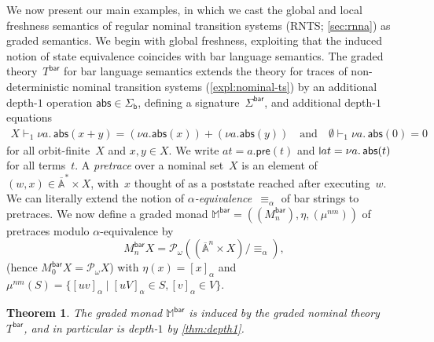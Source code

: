 \documentclass[11pt,a4paper]{amsart}
\newtheorem{theorem}{Theorem}[section]
\newcommand{\Br}{\mathsf{bar}}
\newcommand{\pre}{\mathsf{pre}}
\newcommand{\abs}{\mathsf{abs}}
\newcommand{\Term}{\mathsf{Term}}
\newcommand{\sigb}{\Sigma_{\mathsf b}}
\newcommand{\Names}{\mathbb{A}}
\newcommand{\barNames}{\overline{\Names}}
\newcommand{\alphaeq}{\equiv_\alpha}
\newcommand{\pow}{\mathcal{P}}
\newcommand{\powf}{\pow_{\omega}}
\theoremstyle{plain}
\newcommand{\midmid}{\hspace{0.2ex}{\rule[-0.1ex]{0.6pt}{1.65ex}}\hspace{0.2ex}}
\newcommand{\newletter}[1]{{\midmid}#1}
\numberwithin{equation}{section}
\newcommand{\monad}{{\mathbb{M}}}
\newcommand{\+}[1]{\mathcal{#1}\xspace}
\theoremstyle{definition}
\begin{document}
\noindent We now present our main examples, in which we cast the
global and local freshness semantics of regular nominal transition
systems (RNTS; \cref{sec:rnna}) as graded semantics. We begin with
global freshness, exploiting that the induced notion of state
equivalence coincides with bar language semantics. The graded
theory~$T^{\Br}$ for bar language semantics extends the theory for
traces of non-deterministic nominal transition systems
(\cref{expl:nominal-ts}) by an additional depth-$1$ operation
$\abs\in\sigb$, defining a signature~$\Sigma^{\Br}$, and additional
depth-$1$ equations
\begin{gather}
  X\vdash_1\nu a.\,\abs(x+y)=(\nu a.\abs(x))+(\nu a.\abs(y))
  \quad\text{and}\quad
  \emptyset\vdash_1\nu a.\,\abs(0)=0 \label{ax:distributivity-abs}
\end{gather}
for all orbit-finite~$X$ and $x,y\in X$. We write
$at=a.\pre(t)$ and $\newletter at=\nu a.\,\abs(t)$ for all
terms~$t$. A \emph{pretrace} over a nominal set~$X$ is an element of
$(w,x)\in\barNames^*\times X$, with~$x$ thought of as a poststate
reached after executing~$w$. We can literally extend the notion of
\emph{$\alpha$-equivalence}~$\alphaeq$ of bar strings to pretraces.
We now define a graded monad $\monad^\Br=((M^\Br_n),\eta,(\mu^{nm}))$
of pretraces modulo $\alpha$-equivalence by
\begin{equation*}
  M^\Br_nX=\powf((\barNames^n\times X)/\alphaeq),
\end{equation*}
(hence $M^\Br_0X=\powf X$) with $\eta(x)=[x]_\alpha$ and
$\mu^{nm}(S)=\{[uv]_\alpha\mid [uV]_\alpha\in S,[v]_\alpha\in V\}$.
\begin{theorem}\label{thm:global-freshness-monad}
  The graded monad $\monad^\Br$ is induced by the graded nominal
  theory~$T^\Br$, and in particular is depth-$1$ by \cref{thm:depth1}.
\end{theorem}
\end{document}
